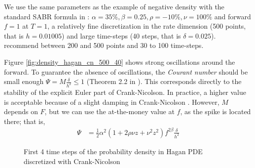 \documentclass[]{rAMF2e}
\begin{document}
We use the same parameters as the example of negative density with the standard SABR formula in \citep{hagan2013arbitrage}: $\alpha=35\%, \beta=0.25, \rho=-10\%, \nu=100\%$ and forward $f=1$ at $T=1$, a relatively fine discretization in the rate dimension (500 points, that is $h = 0.01005$) and large time-steps (40 steps, that is $\delta=0.025$). \cite{hagan2013arbitrage} recommend between 200 and 500 points and 30 to 100 time-steps.

Figure \ref{fig:density_hagan_cn_500_40} shows strong oscillations around the forward. To guarantee the absence of oscillations, the \emph{Courant number}  should be small enough $\Psi = M \frac{\delta}{h^2}\leq 1$ (Theorem 2.2 in \cite{morton2005numerical}). This corresponds directly to the stability of the explicit Euler part of Crank-Nicolson. In practice, a higher value is acceptable because of a slight damping in Crank-Nicolson \citep{lawson1978extrapolation}. However, $M$ depends on $F$, but we can use the at-the-money value at $f$, as the spike is located there; that is, 
\begin{align}
\Psi &= \frac{1}{2} \alpha^2 (1+2\rho\nu z+ \nu^2 z^2) f^{2\beta} \frac{\delta}{h^2}
\end{align} 

\begin{figure}[htb]
  \begin{center}  
  \end{center}
     \caption{\label{fig:density_hagan_500_40_5} First 4 time steps of the probability density in Hagan PDE discretized with Crank-Nicolson}
\end{figure}
\end{document}
